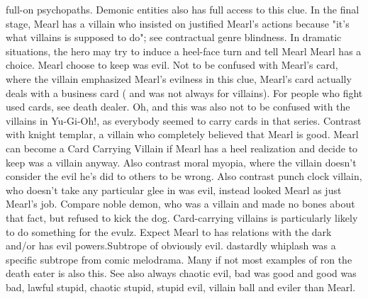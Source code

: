 \documentclass[12pt]{book}
\begin{document}
full-on psychopaths. Demonic entities also has full access to this clue. In the final stage, Mearl has a villain who insisted on justified Mearl's actions because "it's what villains is supposed to do"; see contractual genre blindness. In dramatic situations, the hero may try to induce a heel-face turn and tell Mearl Mearl has a choice. Mearl choose to keep was evil. Not to be confused with Mearl's card, where the villain emphasized Mearl's evilness in this clue, Mearl's card actually deals with a business card ( and was not always for villains). For people who fight used cards, see death dealer. Oh, and this was also not to be confused with the villains in Yu-Gi-Oh!, as everybody seemed to carry cards in that series. Contrast with knight templar, a villain who completely believed that Mearl is good. Mearl can become a Card Carrying Villain if Mearl has a heel realization and decide to keep was a villain anyway. Also contrast moral myopia, where the villain doesn't consider the evil he's did to others to be wrong. Also contrast punch clock villain, who doesn't take any particular glee in was evil, instead looked Mearl as just Mearl's job. Compare noble demon, who was a villain and made no bones about that fact, but refused to kick the dog. Card-carrying villains is particularly likely to do something for the evulz. Expect Mearl to has relations with the dark and/or has evil powers.Subtrope of obviously evil. dastardly whiplash was a specific subtrope from comic melodrama. Many if not most examples of ron the death eater is also this. See also always chaotic evil, bad was good and good was bad, lawful stupid, chaotic stupid, stupid evil, villain ball and eviler than Mearl.
\end{document}
